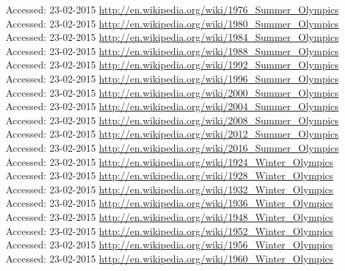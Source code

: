 \documentclass[11pt,a4paper]{article}
\begin{document}
\begin{thebibliography}{9}
  {Accessed: 23-02-2015}
  \url{http://en.wikipedia.org/wiki/1976_Summer_Olympics}\\
  {Accessed: 23-02-2015}
  \url{http://en.wikipedia.org/wiki/1980_Summer_Olympics}\\
  {Accessed: 23-02-2015}
  \url{http://en.wikipedia.org/wiki/1984_Summer_Olympics}\\
  {Accessed: 23-02-2015}
  \url{http://en.wikipedia.org/wiki/1988_Summer_Olympics}\\
  {Accessed: 23-02-2015}
  \url{http://en.wikipedia.org/wiki/1992_Summer_Olympics}\\
  {Accessed: 23-02-2015}
  \url{http://en.wikipedia.org/wiki/1996_Summer_Olympics}\\
  {Accessed: 23-02-2015}
  \url{http://en.wikipedia.org/wiki/2000_Summer_Olympics}\\
  {Accessed: 23-02-2015}
  \url{http://en.wikipedia.org/wiki/2004_Summer_Olympics}\\
  {Accessed: 23-02-2015}
  \url{http://en.wikipedia.org/wiki/2008_Summer_Olympics}\\
  {Accessed: 23-02-2015}
  \url{http://en.wikipedia.org/wiki/2012_Summer_Olympics}\\
  {Accessed: 23-02-2015}
  \url{http://en.wikipedia.org/wiki/2016_Summer_Olympics}\\
  {Accessed: 23-02-2015}
  \url{http://en.wikipedia.org/wiki/1924_Winter_Olympics}\\
  {Accessed: 23-02-2015}
  \url{http://en.wikipedia.org/wiki/1928_Winter_Olympics}\\
  {Accessed: 23-02-2015}
  \url{http://en.wikipedia.org/wiki/1932_Winter_Olympics}\\
  {Accessed: 23-02-2015}
  \url{http://en.wikipedia.org/wiki/1936_Winter_Olympics}\\
  {Accessed: 23-02-2015}
  \url{http://en.wikipedia.org/wiki/1948_Winter_Olympics}\\
  {Accessed: 23-02-2015}
  \url{http://en.wikipedia.org/wiki/1952_Winter_Olympics}\\
  {Accessed: 23-02-2015}
  \url{http://en.wikipedia.org/wiki/1956_Winter_Olympics}\\
  {Accessed: 23-02-2015}
  \url{http://en.wikipedia.org/wiki/1960_Winter_Olympics}\\

\end{thebibliography}
\end{document}
